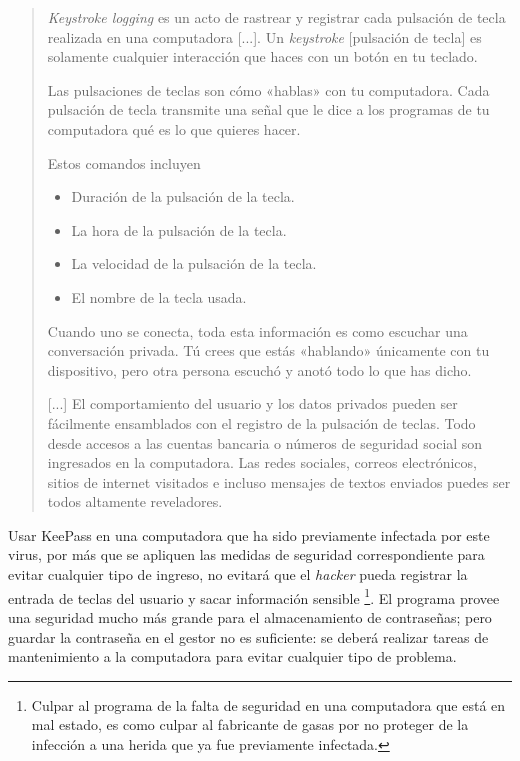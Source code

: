 \documentclass[12pt,a4paper,twoside]{book}
\begin{document}
\begin{quotation}
\textit{Keystroke logging} es un acto de rastrear y registrar cada pulsación de tecla realizada en una computadora [...]. Un \textit{keystroke} [pulsación de tecla] es solamente cualquier interacción que haces con un botón en tu teclado.

Las pulsaciones de teclas son cómo «hablas» con tu computadora. Cada pulsación de tecla transmite una señal que le dice a los programas de tu computadora qué es lo que quieres hacer.

Estos comandos incluyen

\begin{itemize}
\item Duración de la pulsación de la tecla.
\item La hora de la pulsación de la tecla.
\item La velocidad de la pulsación de la tecla.
\item El nombre de la tecla usada.
\end{itemize}

Cuando uno se conecta, toda esta información es como escuchar una conversación privada. Tú crees que estás «hablando» únicamente con tu dispositivo, pero otra persona escuchó y anotó todo lo que has dicho.

[...] El comportamiento del usuario y los datos privados pueden ser fácilmente ensamblados con el registro de la pulsación de teclas. Todo desde accesos a las cuentas bancaria o números de seguridad social son ingresados en la computadora. Las redes sociales, correos electrónicos, sitios de internet visitados e incluso mensajes de textos enviados puedes ser todos altamente reveladores. \cite{kaspersky:keylogger}
\end{quotation}

Usar KeePass en una computadora que ha sido previamente infectada por este virus, por más que se apliquen las medidas de seguridad correspondiente para evitar cualquier tipo de ingreso, no evitará que el \textit{hacker} pueda registrar la entrada de teclas del usuario y sacar información sensible \footnote{Culpar al programa de la falta de seguridad en una computadora que está en mal estado, es como culpar al fabricante de gasas por no proteger de la infección a una herida que ya fue previamente infectada.}. El programa provee una seguridad mucho más grande para el almacenamiento de contraseñas; pero guardar la contraseña en el gestor no es suficiente: se deberá realizar tareas de mantenimiento a la computadora para evitar cualquier tipo de problema.
\end{document}
